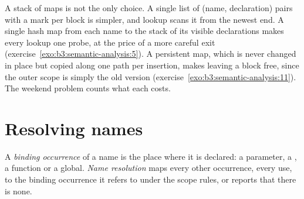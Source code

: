 \label{out:b3:semantic-analysis:trace}

\begin{omfigure}
\par{}
\end{omfigure}

A stack of maps is not the only choice. A single list of (name, declaration) pairs with a mark per block is simpler, and lookup scans it from the newest end. A single hash map from each name to the stack of its visible declarations makes every lookup one probe, at the price of a more careful exit (exercise~\ref{exo:b3:semantic-analysis:5}). A persistent map, which is never changed in place but copied along one path per insertion, makes leaving a block free, since the outer scope is simply the old version (exercise~\ref{exo:b3:semantic-analysis:11}). The weekend problem counts what each costs.

\section{Resolving names}\label{sec:b3:semantic-analysis:resolution}

\begin{definition}\label{def:b3:semantic-analysis:resolution}
A \emph{binding occurrence} of a name is the place where it is declared: a parameter, a , a function or a global. \emph{Name resolution} maps every other occurrence, every use, to the binding occurrence it refers to under the scope rules, or reports that there is none.
\end{definition}

